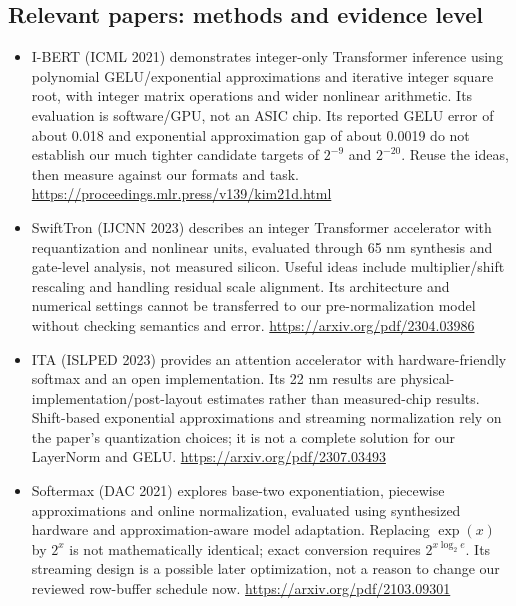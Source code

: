 \documentclass[11pt,a4paper]{article}
\begin{document}
\subsection{Relevant papers: methods and evidence level}
\begin{itemize}
\item I-BERT (ICML 2021) demonstrates integer-only Transformer inference using polynomial GELU/exponential approximations and iterative integer square root, with integer matrix operations and wider nonlinear arithmetic. Its evaluation is software/GPU, not an ASIC chip. Its reported GELU error of about 0.018 and exponential approximation gap of about 0.0019 do not establish our much tighter candidate targets of $2^{-9}$ and $2^{-20}$. Reuse the ideas, then measure against our formats and task. \url{https://proceedings.mlr.press/v139/kim21d.html}
\item SwiftTron (IJCNN 2023) describes an integer Transformer accelerator with requantization and nonlinear units, evaluated through 65 nm synthesis and gate-level analysis, not measured silicon. Useful ideas include multiplier/shift rescaling and handling residual scale alignment. Its architecture and numerical settings cannot be transferred to our pre-normalization model without checking semantics and error. \url{https://arxiv.org/pdf/2304.03986}
\item ITA (ISLPED 2023) provides an attention accelerator with hardware-friendly softmax and an open implementation. Its 22 nm results are physical-implementation/post-layout estimates rather than measured-chip results. Shift-based exponential approximations and streaming normalization rely on the paper's quantization choices; it is not a complete solution for our LayerNorm and GELU. \url{https://arxiv.org/pdf/2307.03493}
\item Softermax (DAC 2021) explores base-two exponentiation, piecewise approximations and online normalization, evaluated using synthesized hardware and approximation-aware model adaptation. Replacing $\exp(x)$ by $2^x$ is not mathematically identical; exact conversion requires $2^{x\log_2 e}$. Its streaming design is a possible later optimization, not a reason to change our reviewed row-buffer schedule now. \url{https://arxiv.org/pdf/2103.09301}
\end{itemize}
\end{document}
